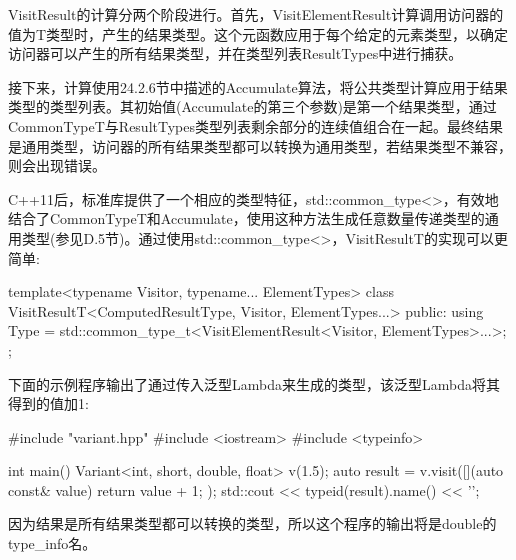 VisitResult的计算分两个阶段进行。首先，VisitElementResult计算调用访问器的值为T类型时，产生的结果类型。这个元函数应用于每个给定的元素类型，以确定访问器可以产生的所有结果类型，并在类型列表ResultTypes中进行捕获。

接下来，计算使用24.2.6节中描述的Accumulate算法，将公共类型计算应用于结果类型的类型列表。其初始值(Accumulate的第三个参数)是第一个结果类型，通过CommonTypeT与ResultTypes类型列表剩余部分的连续值组合在一起。最终结果是通用类型，访问器的所有结果类型都可以转换为通用类型，若结果类型不兼容，则会出现错误。

C++11后，标准库提供了一个相应的类型特征，std::common\_type<>，有效地结合了CommonTypeT和Accumulate，使用这种方法生成任意数量传递类型的通用类型(参见D.5节)。通过使用std::common\_type<>，VisitResultT的实现可以更简单:

\begin{cpp}
template<typename Visitor, typename... ElementTypes>
class VisitResultT<ComputedResultType, Visitor, ElementTypes...>
{
	public:
	using Type =
		std::common_type_t<VisitElementResult<Visitor, ElementTypes>...>;
};
\end{cpp}

下面的示例程序输出了通过传入泛型Lambda来生成的类型，该泛型Lambda将其得到的值加1:

\begin{cpp}
#include "variant.hpp"
#include <iostream>
#include <typeinfo>

int main()
{
	Variant<int, short, double, float> v(1.5);
	auto result = v.visit([](auto const& value) {
							return value + 1;
						});
	std::cout << typeid(result).name() << ’\n’;
}
\end{cpp}

因为结果是所有结果类型都可以转换的类型，所以这个程序的输出将是double的type\_info名。







